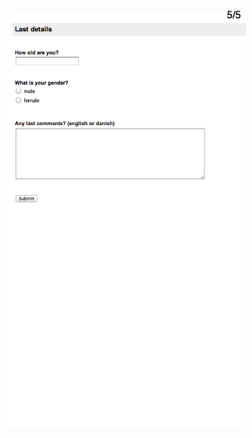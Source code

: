 \begin{figure}[htb]
  \centering
    \includegraphics[width=0.8\textwidth]{images/evalform2e}
\end{figure}

%
%
%
%
%
%
%
%
%
